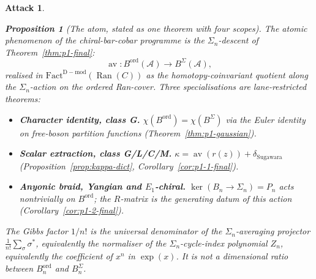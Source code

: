\documentclass[11pt]{article}
\newtheorem{proposition}[theorem]{Proposition}
\newtheorem*{attack}{Attack}
\theoremstyle{definition}
\DeclareMathOperator{\Ran}{Ran}
\DeclareMathOperator{\av}{av}
\newcommand{\ord}{\mathrm{ord}}
\begin{document}
\begin{attack}
\begin{proposition}[The atom, stated as one theorem with four scopes]\label{prop:atom-final}
The \emph{atomic phenomenon} of the chiral-bar-cobar programme is the
$\Sigma_n$-descent of Theorem~\ref{thm:p1-final}:
\[
\av: B^{\ord}(\mathcal A) \longrightarrow B^{\Sigma}(\mathcal A),
\]
realised in $\mathrm{Fact}^{\mathrm{D-mod}}(\Ran(C))$ as the
homotopy-coinvariant quotient along the $\Sigma_n$-action on the ordered
Ran-cover. Three specialisations are lane-restricted theorems:
\begin{itemize}[leftmargin=1.4em]
\item \textbf{Character identity, class G.}
$\chi(B^{\ord}) = \chi(B^{\Sigma})$ via the Euler identity on
free-boson partition functions (Theorem~\ref{thm:p1-gaussian}).
\item \textbf{Scalar extraction, class G/L/C/M.}
$\kappa = \av(r(z)) + \delta_{\mathrm{Sugawara}}$
(Proposition~\ref{prop:kappa-dict}, Corollary~\ref{cor:p1-1-final}).
\item \textbf{Anyonic braid, Yangian and $E_1$-chiral.}
$\ker(B_n \to \Sigma_n) = P_n$ acts nontrivially on $B^{\ord}$;
the $R$-matrix is the generating datum of this action
(Corollary~\ref{cor:p1-2-final}).
\end{itemize}
The Gibbs factor $1/n!$ is the universal denominator of the
$\Sigma_n$-averaging projector $\frac{1}{n!}\sum_\sigma \sigma^*$,
equivalently the normaliser of the $\Sigma_n$-cycle-index polynomial
$Z_n$, equivalently the coefficient of $x^n$ in $\exp(x)$. It is
\emph{not} a dimensional ratio between $B^{\ord}_n$ and $B^{\Sigma}_n$.
\end{proposition}


\end{attack}
\end{document}
